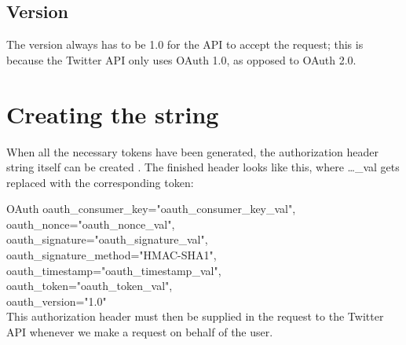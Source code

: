 
\subsection*{Version}
The version always has to be 1.0 for the API to accept the request; this is
because the Twitter \ac{API} only uses OAuth 1.0, as opposed to OAuth 2.0.

\section{Creating the string}\label{label:stringCreate}
When all the necessary tokens have been generated, the authorization header
string itself can be created \citep{TwitterAPIAuth}. The finished header looks like this, where
\ldots\_val gets replaced with the corresponding token:\nl

OAuth oauth\_consumer\_key="oauth\_consumer\_key\_val",\\
oauth\_nonce="oauth\_nonce\_val", \\
oauth\_signature="oauth\_signature\_val", \\
oauth\_signature\_method="HMAC-SHA1", \\
oauth\_timestamp="oauth\_timestamp\_val", \\
oauth\_token="oauth\_token\_val", \\
oauth\_version="1.0" \\

This authorization header must then be supplied in the request to the Twitter
API whenever we make a request on behalf of the user.
